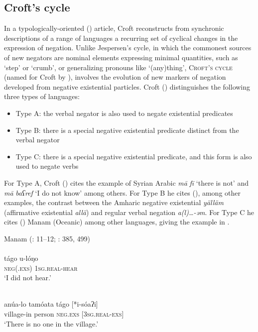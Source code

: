 \documentclass[output=paper]{langsci/langscibook}
\begin{document}
\subsection{Croft’s cycle}


In a typologically-oriented (\citeyear{Croft1991}) article, Croft reconstructs from synchronic descriptions of a range of languages a recurring set of cyclical changes in the expression of negation. Unlike Jespersen’s cycle, in which the commonest sources of new negators are nominal elements expressing minimal quantities, such as ‘step’ or ‘crumb’, or generalizing pronouns like ‘(any)thing’, \textsc{Croft’s} \textsc{cycle} (named for Croft by \citealt{Kahrel1996}), involves the evolution of new markers of negation developed from negative existential particles. Croft (\citeyear[6]{Croft1991}) distinguishes the following three types of languages:

\begin{itemize}[noitemsep]
	\item[] Type A: the verbal negator is also used to negate existential predicates
	\item[] Type B: there is a special negative existential predicate distinct from the verbal negator
	\item[] Type C: there is a special negative existential predicate, and this form is also used to negate verbs 
\end{itemize}

For Type A, Croft (\citeyear[7]{Croft1991}) cites the example of Syrian Arabic \textit{mā} \textit{fī} ‘there is not’ and \textit{mā} \textit{baʕref} ‘I do not know’ among others. For Type B he cites (\citeyear[9]{Croft1991}), among other examples, the contrast between the Amharic negative existential \textit{yälläm} (affirmative existential \textit{allä}) and regular verbal negation \textit{a(l)…-əm}. For Type C he cites (\citeyear[11--12]{Croft1991}) Manam (Oceanic) among other languages, giving the example in .


\ea\label{man}
{Manam (\citealt{Croft1991}: 11–12; \citealt{Lichtenberk1983}: 385, 499)}\\
\\
\gll tágo u-lóŋo\\
     \textsc{neg(.exs)} \textsc{1sg.real-}\textsc{\textup{hear}}  \\
\glt ‘I did not hear.’

\\
\gll anúa-lo tamóata tágo [*i-sóaʔi]\\
     village-in person \textsc{neg.exs} \textsc{[3sg.real-exs]}\\
\glt  ‘There is no one in the village.’
\z
\z
\end{document}
